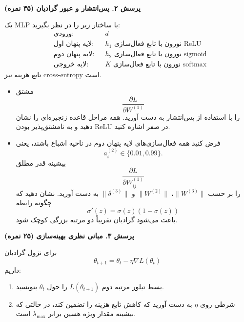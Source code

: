 \vspace{1cm}

\textbf{پرسش ۲. پس‌انتشار و عبور گرادیان (۳۵ نمره)}

یک MLP با ساختار زیر را در نظر بگیرید:
\begin{align*}
    &\text{ورودی:} & &d \\
    &\text{لایه پنهان اول:} & &h_1 \text{ نورون با تابع فعال‌سازی } \text{ReLU} \\
    &\text{لایه پنهان دوم:} & &h_2 \text{ نورون با تابع فعال‌سازی } \text{sigmoid} \\
    &\text{لایه خروجی:} & &K \text{ نورون با تابع فعال‌سازی } \text{softmax}
\end{align*}
تابع هزینه نیز cross-entropy است.

\begin{itemize}
    \item[\textbf{(الف)}] مشتق
    \[
    \frac{\partial L}{\partial W^{(1)}}
    \]
    را با استفاده از پس‌انتشار به دست آورید. همه مراحل قاعده زنجیره‌ای را نشان دهید و به نامشتق‌پذیر بودن ReLU در صفر اشاره کنید.
    
    \item[\textbf{(ب)}] فرض کنید همه فعال‌سازی‌های لایه پنهان دوم در ناحیه اشباع باشند، یعنی
    \[
    a_i^{(2)} \in \{0.01, 0.99\}.
    \]
    بیشینه قدر مطلق
    \[
    \frac{\partial L}{\partial W_{ij}^{(1)}}
    \]
    را بر حسب $\|W^{(3)}\|$، $\|W^{(2)}\|$ و $\|\delta^{(3)}\|$ به دست آورید. نشان دهید که چگونه رابطه
    \[
    \sigma'(z) = \sigma(z)(1 - \sigma(z))
    \]
    باعث می‌شود گرادیان تقریباً دو مرتبه بزرگی کوچک شود.
\end{itemize}

\vspace{1cm}

\textbf{پرسش ۳. مبانی نظری بهینه‌سازی (۲۵ نمره)}

برای نزول گرادیان
\[
\theta_{t+1} = \theta_t - \eta \nabla L(\theta_t)
\]
داریم:
\begin{enumerate}
    \item[(۱)] بسط تیلور مرتبه دوم $L(\theta_{t+1})$ را حول $\theta_t$ بنویسید.
    \item[(۲)] شرطی روی $\eta$ به دست آورید که کاهش تابع هزینه را تضمین کند، در حالتی که بیشینه مقدار ویژه هسین برابر $\lambda_{\max}$ است.
\end{enumerate}